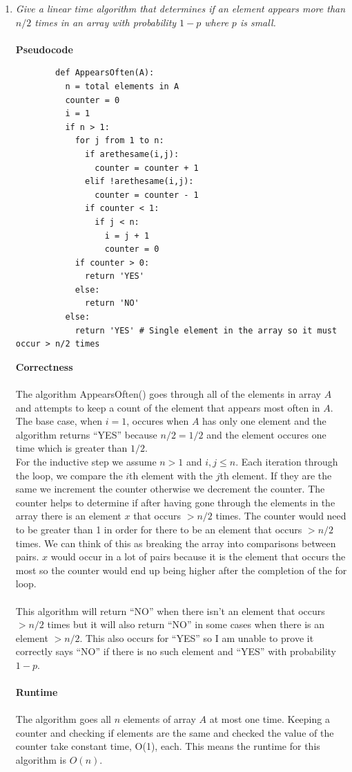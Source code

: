 \documentclass[12pt]{article}
\begin{document}
\begin{enumerate}
        \newpage
		\item \textit{Give a linear time algorithm that determines if an 
		element appears more than $n/2$ times in an array with probability $1-p$ where $p$ is small.}\\
		\\
		\textbf{Pseudocode}
		\begin{verbatim}
		def AppearsOften(A):
		  n = total elements in A
		  counter = 0
		  i = 1
		  if n > 1:
		    for j from 1 to n:
		      if arethesame(i,j):
		        counter = counter + 1
		      elif !arethesame(i,j):
		        counter = counter - 1
		      if counter < 1:
		        if j < n:
		          i = j + 1
		          counter = 0
		    if counter > 0:
		      return 'YES'
		    else:
		      return 'NO'
		  else:
		    return 'YES' # Single element in the array so it must occur > n/2 times
		\end{verbatim}
		\textbf{Correctness}\\
		\\
		The algorithm AppearsOften() goes through all of the elements in array $A$ and attempts to keep a count of the
		element that appears most often in $A$.  The base case, when $i = 1$, occures when $A$ has only one element and the algorithm returns ``YES'' because $n/2 = 1/2$ and the element occures one time which is greater than $1/2$.
		\\
		For the inductive step we assume $n > 1$ and $i,j \le n$.  Each iteration through the loop, we compare the $i$th element with the $j$th element.  If they are the same we increment the counter otherwise we decrement the counter.  The counter helps to determine if after having gone through the elements in the array there is an element $x$ that occurs $> n/2$ times.  The counter would need to be greater than 1 in order for there to be an element that occurs $> n/2$ times.  We can think of this as breaking the array into comparisons between pairs.  $x$ would occur in a lot of pairs because it is the element that occurs the most so the counter would end up being higher after the completion of the for loop.\\
		\\
		This algorithm will return ``NO'' when there isn't an element that occurs $> n/2$ times but it will also return ``NO'' in some cases when there is an element $> n/2$.  This also occurs for ``YES'' so I am unable to prove it correctly says ``NO'' if there is no such element and ``YES'' with probability $1-p$.\\      
		\\
		\textbf{Runtime}\\
		\\
		The algorithm goes all $n$ elements of array $A$ at most one time.  
		Keeping a counter and checking if elements are the 
		same and checked the value of the counter take constant time, O(1), each.
		This means the runtime for this algorithm is $O(n)$.
		

\end{enumerate}
\end{document}
